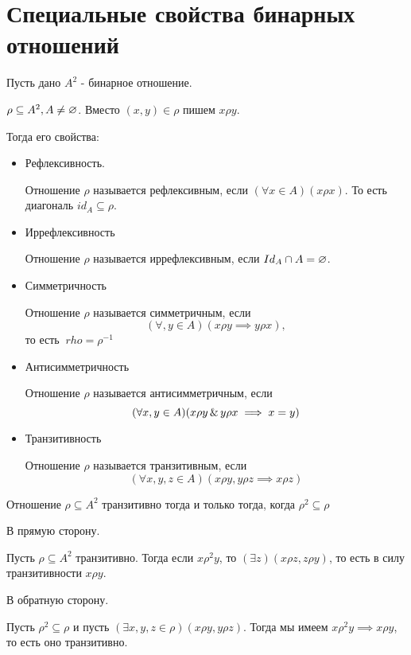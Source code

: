 \section{Специальные свойства бинарных отношений}

Пусть дано $A^2$ - бинарное отношение.

$\rho \subseteq A^2, A\neq \varnothing$. Вместо $(x,y) \in \rho$ пишем
$x\rho y$.

Тогда его свойства:
\begin{itemize}
	\item Рефлексивность.

		Отношение $\rho$ называется рефлексивным, если  $(\forall x \in A)(x\rho x)$.
		То есть диагональ $id_A \subseteq \rho$.
	\item Иррефлексивность

		Отношение $\rho$ называется иррефлексивным, если $Id_A \cap A = \varnothing$.
	\item Симметричность

		Отношение  $\rho$ называется симметричным, если \[
			(\forall ,y \in A)(x\rho y \implies y\rho x),
		\]
		то есть $\ rho = \rho^{-1}$
	\item Антисимметричность

		Отношение $\rho$ называется антисимметричным, если
		$$
			(\forall x,y \in A)(x\rho y \operatorname{\&} y\rho x \implies x = y)
			$$
	\item Транзитивность

		Отношение $\rho$ называется транзитивным, если  \[
			(\forall x,y,z \in A)(x\rho y, y\rho z \implies x\rho z)
		\] 
\end{itemize}

\begin{theorem}
Отношение $\rho \subseteq A^2$ транзитивно тогда и только тогда, когда $\rho^2 \subseteq \rho$
\end{theorem}

\begin{myproof}
В прямую сторону.

Пусть $\rho \subseteq A^2$ транзитивно. Тогда если $x\rho^2 y$, то
$(\exists z)(x\rho z, z\rho y)$, то есть в силу транзитивности $x\rho y$.

\medskip

В обратную сторону.

Пусть  $\rho^2 \subseteq \rho$ и пусть $(\exists x,y,z \in \rho)(x\rho y, y\rho z)$.
Тогда мы имеем $x\rho^2 y \implies x\rho y$, то есть оно транзитивно.
\end{myproof}

